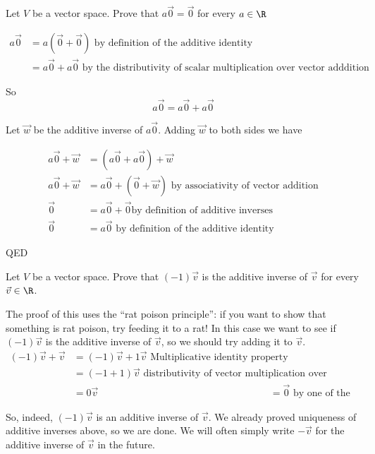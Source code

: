 \documentclass{ximera}
\begin{document}
Let $V$ be a vector space.  Prove that $a\vec{0} = \vec{0}$ for every $a \in \R$

\begin{free-response}
  \begin{align*}
    a\vec{0} &= a(\vec{0}+\vec{0}) \text{ by definition of the additive identity}\\
    &=a\vec{0}+a\vec{0} \text{ by the distributivity of scalar multiplication over vector adddition}
  \end{align*}
  
  So 
  \[
  a\vec{0} = a\vec{0}+a\vec{0}
  \]
  
  Let $\vec{w}$ be the additive inverse of $a\vec{0}$.  Adding $\vec{w}$ to both sides we have
  
  \begin{align*}
    a\vec{0}+\vec{w} &= \left(a\vec{0}+a\vec{0}\right) +\vec{w}\\
    a\vec{0}+\vec{w} &= a\vec{0}+\left( \vec{0}+\vec{w}\right) \text{ by associativity of vector addition}\\
    \vec{0} &= a\vec{0}+\vec{0} \text{by definition of additive inverses}\\
    \vec{0} &= a\vec{0} \text{ by definition of the additive identity}
  \end{align*}
  
  QED
\end{free-response}

Let $V$ be a vector space.  Prove that $(-1)\vec{v}$ is the additive inverse of $\vec{v}$ for every $\vec{v} \in \R$.

\begin{free-response}
  The proof of this uses the ``rat poison principle'':  if you want to show that something is rat poison, try feeding it to a rat! 
  In this case we want to see if $(-1)\vec{v}$ is the additive inverse of $\vec{v}$, so we should try adding it to $\vec{v}$.
  \begin{align*}
    (-1)\vec{v}+\vec{v} &= (-1)\vec{v}+1\vec{v} \text{ Multiplicative identity property}\\
    &= (-1+1)\vec{v}  \text{ distributivity of vector multiplication over scalar addition}\\
    &= 0\vec{v} 
    &= \vec{0} \text{ by one of the theorems above}
  \end{align*} 
  
  So, indeed, $(-1)\vec{v}$ is an additive inverse
  of $\vec{v}$.  We already proved uniqueness of additive inverses above, so we are done.  
  We will often simply write $-\vec{v}$ for the additive inverse of
  $\vec{v}$ in the future.
\end{free-response}
\end{document}
